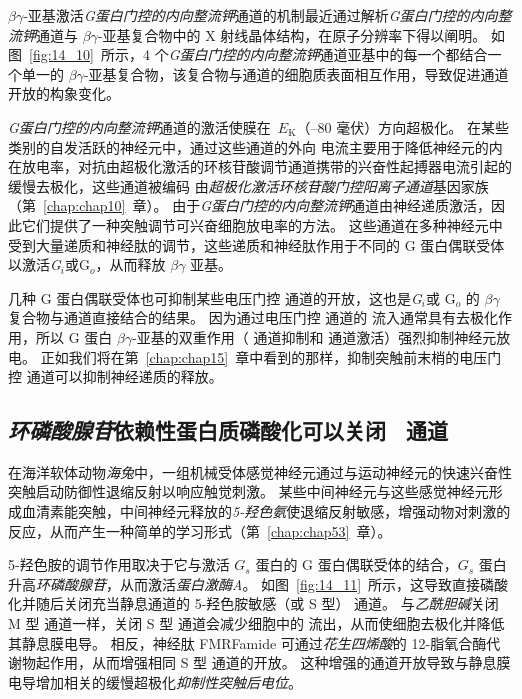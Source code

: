 $\beta \gamma$-亚基激活\textit{G蛋白门控的内向整流钾}通道的机制最近通过解析\textit{G蛋白门控的内向整流钾}通道与 $\beta \gamma$-亚基复合物中的 X 射线晶体结构，在原子分辨率下得以阐明。
如图~\ref{fig:14_10}~所示，4 个\textit{G蛋白门控的内向整流钾}通道亚基中的每一个都结合一个单一的 $\beta \gamma$-亚基复合物，该复合物与通道的细胞质表面相互作用，导致促进通道开放的构象变化。


\textit{G蛋白门控的内向整流钾}通道的激活使膜在~$E_\text{K}$（–80 毫伏）方向超极化。
在某些类别的自发活跃的神经元中，通过这些通道的外向  电流主要用于降低神经元的内在放电率，对抗由超极化激活的环核苷酸调节通道携带的兴奋性起搏器电流引起的缓慢去极化，这些通道被编码 由\textit{超极化激活环核苷酸门控阳离子通道}基因家族（第~\ref{chap:chap10}~章）。
由于\textit{G蛋白门控的内向整流钾}通道由神经递质激活，因此它们提供了一种突触调节可兴奋细胞放电率的方法。
这些通道在多种神经元中受到大量递质和神经肽的调节，这些递质和神经肽作用于不同的 G 蛋白偶联受体以激活\textit{G$_i $}或G$_o$，从而释放 $\beta \gamma$ 亚基。


几种 G 蛋白偶联受体也可抑制某些电压门控  通道的开放，这也是\textit{G$_i $}或 G$_o$ 的 $\beta \gamma$ 复合物与通道直接结合的结果。
因为通过电压门控  通道的  流入通常具有去极化作用，所以 G 蛋白 $\beta \gamma$-亚基的双重作用（ 通道抑制和  通道激活）强烈抑制神经元放电。
正如我们将在第~\ref{chap:chap15}~章中看到的那样，抑制突触前末梢的电压门控  通道可以抑制神经递质的释放。



\subsection{\textit{环磷酸腺苷}依赖性蛋白质磷酸化可以关闭~ 通道}

在海洋软体动物\textit{海兔}中，一组机械受体感觉神经元通过与运动神经元的快速兴奋性突触启动防御性退缩反射以响应触觉刺激。
某些中间神经元与这些感觉神经元形成血清素能突触，中间神经元释放的\textit{5-羟色氨}使退缩反射敏感，增强动物对刺激的反应，从而产生一种简单的学习形式（第~\ref{chap:chap53}~章）。


5-羟色胺的调节作用取决于它与激活 $ G_s $ 蛋白的 G 蛋白偶联受体的结合，$ G_s $ 蛋白升高\textit{环磷酸腺苷}，从而激活\textit{蛋白激酶A}。
如图~\ref{fig:14_11}~所示，这导致直接磷酸化并随后关闭充当静息通道的 5-羟色胺敏感（或 S 型） 通道。
与\textit{乙酰胆碱}关闭 M 型  通道一样，关闭 S 型  通道会减少细胞中的  流出，从而使细胞去极化并降低其静息膜电导。
相反，神经肽 FMRFamide 可通过\textit{花生四烯酸}的 12-脂氧合酶代谢物起作用，从而增强相同 S 型  通道的开放。
这种增强的通道开放导致与静息膜电导增加相关的缓慢超极化\textit{抑制性突触后电位}。


